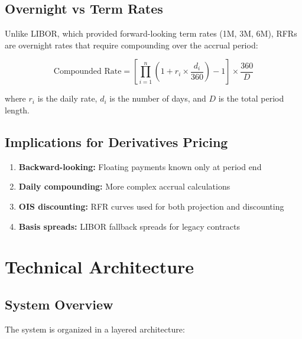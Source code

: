 \documentclass[10pt,a4paper]{article}
\begin{document}
\subsection{Overnight vs Term Rates}

Unlike LIBOR, which provided forward-looking term rates (1M, 3M, 6M), RFRs are overnight rates that require compounding over the accrual period:

\[
\text{Compounded Rate} = \left[\prod_{i=1}^{n}\left(1 + r_i \times \frac{d_i}{360}\right) - 1\right] \times \frac{360}{D}
\]

where $r_i$ is the daily rate, $d_i$ is the number of days, and $D$ is the total period length.

\subsection{Implications for Derivatives Pricing}

\begin{enumerate}
    \item \textbf{Backward-looking:} Floating payments known only at period end
    \item \textbf{Daily compounding:} More complex accrual calculations
    \item \textbf{OIS discounting:} RFR curves used for both projection and discounting
    \item \textbf{Basis spreads:} LIBOR fallback spreads for legacy contracts
\end{enumerate}

\newpage

\section{Technical Architecture}

\subsection{System Overview}

The system is organized in a layered architecture:
\end{document}
